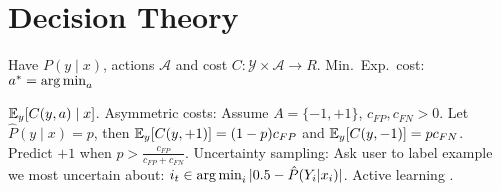\section{Decision Theory}

Have $P(y\mid x)$, actions $\mathcal{A}$ and cost $C : \mathcal{Y} \times
\mathcal{A} \rightarrow R$. Min.\ Exp.\ cost: $a^* = \operatorname*{arg\,min}_a $

$\mathbb{E}_y[C(y, a)\mid x]$. Asymmetric costs: Assume $A = \{-1,+1\}$, $c_{FP}, c_{FN} > 0$. Let $\hat{P}(y
\mid x) = p$, then $\mathbb{E}_y[C(y, +1)] = (1-p) c_{FP}$ and $\mathbb{E}_y[C(y,-1)] = p c_{FN}$. Predict $+1$ when $p > \frac{c_{FP}}{c_{FP}+c_{FN}}$. Uncertainty sampling: Ask user to label example we most uncertain about: $i_t \in \operatorname*{arg\,min}_i | 0.5 - \hat{P} (Y_i|x_i)|$. Active learning .